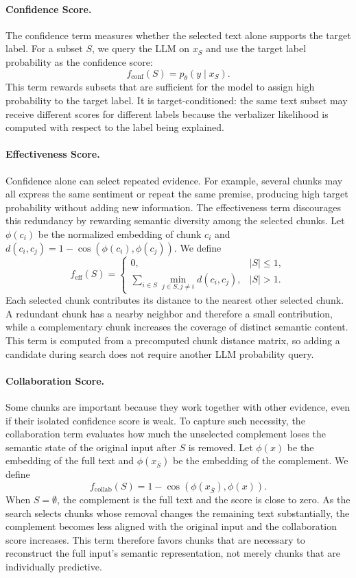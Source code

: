\paragraph{Confidence Score.}
The confidence term measures whether the selected text alone supports the
target label.  For a subset $S$, we query the LLM on $x_S$ and use the target
label probability as the confidence score:
\[
    f_{\mathrm{conf}}(S)=p_{\theta}(y \mid x_S).
\]
This term rewards subsets that are sufficient for the model to assign high
probability to the target label.  It is target-conditioned: the same text subset
may receive different scores for different labels because the verbalizer
likelihood is computed with respect to the label being explained.

\paragraph{Effectiveness Score.}
Confidence alone can select repeated evidence.  For example, several chunks may
all express the same sentiment or repeat the same premise, producing high target
probability without adding new information.  The effectiveness term discourages
this redundancy by rewarding semantic diversity among the selected chunks.  Let
$\phi(c_i)$ be the normalized embedding of chunk $c_i$ and
$d(c_i,c_j)=1-\cos(\phi(c_i),\phi(c_j))$.  We define
\[
    f_{\mathrm{eff}}(S)=
    \begin{cases}
    0, & |S|\leq 1,\\
    \sum_{i\in S}\min_{j\in S, j\neq i} d(c_i,c_j), & |S|>1.
    \end{cases}
\]
Each selected chunk contributes its distance to the nearest other selected
chunk.  A redundant chunk has a nearby neighbor and therefore a small
contribution, while a complementary chunk increases the coverage of distinct
semantic content.  This term is computed from a precomputed chunk distance
matrix, so adding a candidate during search does not require another LLM
probability query.

\paragraph{Collaboration Score.}
Some chunks are important because they work together with other evidence, even
if their isolated confidence score is weak.  To capture such necessity, the
collaboration term evaluates how much the unselected complement loses the
semantic state of the original input after $S$ is removed.  Let
$\phi(x)$ be the embedding of the full text and $\phi(x_{\bar{S}})$ be the
embedding of the complement.  We define
\[
    f_{\mathrm{collab}}(S)=1-\cos(\phi(x_{\bar{S}}),\phi(x)).
\]
When $S=\emptyset$, the complement is the full text and the score is close to
zero.  As the search selects chunks whose removal changes the remaining text
substantially, the complement becomes less aligned with the original input and
the collaboration score increases.  This term therefore favors chunks that are
necessary to reconstruct the full input's semantic representation, not merely
chunks that are individually predictive.

